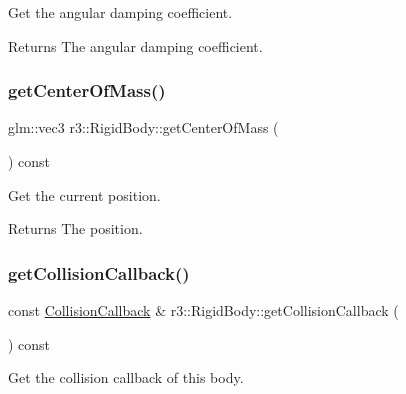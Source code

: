 Get the angular damping coefficient. 

\begin{DoxyReturn}{Returns}
The angular damping coefficient. 
\end{DoxyReturn}
\mbox{\label{classr3_1_1_rigid_body_a9b802fe5774292fbc6ce80cccab15151}} 
\subsubsection{\texorpdfstring{get\+Center\+Of\+Mass()}{getCenterOfMass()}}
{\footnotesize\ttfamily glm\+::vec3 r3\+::\+Rigid\+Body\+::get\+Center\+Of\+Mass (\begin{DoxyParamCaption}{ }\end{DoxyParamCaption}) const}



Get the current position. 

\begin{DoxyReturn}{Returns}
The position. 
\end{DoxyReturn}
\mbox{\label{classr3_1_1_rigid_body_ac138908f5f7aa4763683d9bdd4cc9fd5}} 
\subsubsection{\texorpdfstring{get\+Collision\+Callback()}{getCollisionCallback()}}
{\footnotesize\ttfamily const \mbox{\hyperlink{classr3_1_1_collision_callback}{Collision\+Callback}} \& r3\+::\+Rigid\+Body\+::get\+Collision\+Callback (\begin{DoxyParamCaption}{ }\end{DoxyParamCaption}) const}



Get the collision callback of this body. 

\mbox{\label{classr3_1_1_rigid_body_a621796b0cd49499e10b158096ae5c938}} 

